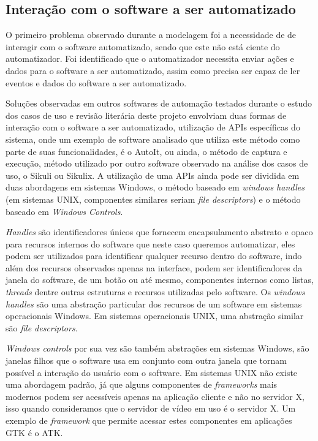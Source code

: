 \documentclass[tg]{mdtufsm}
\begin{document}
            \subsection {Interação com o software a ser automatizado}

                O primeiro problema observado durante a modelagem foi a necessidade de de interagir com o software automatizado, sendo que este não está ciente do automatizador. Foi identificado que o automatizador necessita enviar ações e dados para o software a ser automatizado, assim como precisa ser capaz de ler eventos e dados do software a ser automatizado.

                Soluções observadas em outros softwares de automação testados durante o estudo dos casos de uso e revisão literária deste projeto envolviam duas formas de interação com o software a ser automatizado, utilização de APIs específicas do sistema, onde um exemplo de software analisado que utiliza este método como parte de suas funcionalidades, é o AutoIt, ou ainda, o método de captura e execução, método utilizado por outro software observado na análise dos casos de uso, o Sikuli ou Sikulix. A utilização de uma APIs ainda pode ser dividida em duas abordagens em sistemas Windows, o método baseado em \emph{windows handles} (em sistemas UNIX, componentes similares seriam \emph{file descriptors}) e o método baseado em \emph{Windows Controls}.

                \emph{Handles} são identificadores únicos que fornecem encapsulamento abstrato e opaco para recursos internos do software que neste caso queremos automatizar, eles podem ser utilizados para identificar qualquer recurso dentro do software, indo além dos recursos observados apenas na interface, podem ser identificadores da janela do software, de um botão ou até mesmo, componentes internos como listas, \emph{threads} dentre outras estruturas e recursos utilizadas pelo software. Os \emph{windows handles} são uma abstração particular dos recursos de um software em sistemas operacionais Windows. Em sistemas operacionais UNIX, uma abstração similar são \emph{file descriptors}.

                \emph{Windows controls} por sua vez são também abstrações em sistemas Windows, são janelas filhos que o software usa em conjunto com outra janela que tornam possível a interação do usuário com o software. Em sistemas UNIX não existe uma abordagem padrão, já que alguns componentes de \emph{frameworks} mais modernos podem ser acessíveis apenas na aplicação cliente e não no servidor X, isso quando consideramos que o servidor de vídeo em uso é o servidor X. Um exemplo de \emph{framework} que permite acessar estes componentes em aplicações GTK é o ATK.
\end{document}
